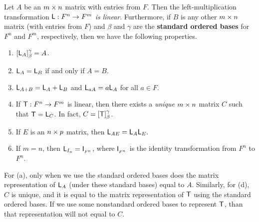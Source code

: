 \begin{theorem} \label{thm 2.15}
Let \(A\) be an \(m \times n\) matrix with entries from \(F\).
Then the left-multiplication transformation \(\textsf{L} : F^n \to F^m\) \emph{is linear}.
Furthermore, if \(B\) is any other \(m \times n\) matrix (with entries from \(F\)) and \(\beta\) and \(\gamma\) are the \textbf{standard ordered bases} for \(F^n\) and \(F^m\), respectively, then we have the following properties.

\begin{enumerate}
\item \([\textsf{L}_A]_{\beta}^{\gamma} = A\).
\item \(\textsf{L}_A = \textsf{L}_B\) if and only if \(A = B\).
\item \(\textsf{L}_{A + B} = \textsf{L}_A + \textsf{L}_B\) and \(\textsf{L}_{aA} = a\textsf{L}_A\) for all \(a \in F\).
\item If \(\textsf{T} : F^n \to F^m\) is linear, then there exists a \emph{unique} \(m \times n\) matrix \(C\) such that \(\textsf{T} = \textsf{L}_C\).
    In fact, \(C = [\textsf{T}]_{\beta}^{\gamma}\).
\item If \(E\) is an \(n \times p\) matrix, then \(\textsf{L}_{AE} = \textsf{L}_A\textsf{L}_E\).
\item If \(m = n\), then \(\textsf{L}_{I_n} = \textsf{I}_{_{F^n}}\), where \(\textsf{I}_{_{F^n}}\) is the identity transformation from \(F^n\) to \(F^n\).
\end{enumerate}
\end{theorem}

\begin{note}
For (a), only when we use the standard ordered bases does the matrix representation of \(\textsf{L}_A\) (under these standard bases) equal to \(A\).
Similarly, for (d), \(C\) is unique, and it is equal to the matrix representation of \(\textsf{T}\) using the standard ordered bases.
If we use some nonstandard ordered bases to represent \(\textsf{T}\), than that representation will not equal to \(C\).
\end{note}

